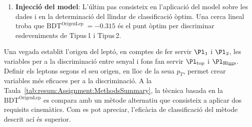 \begin{enumerate}
	
	\item \textbf{Injecció del model}: L'últim pas consisteix en l'aplicació del model sobre les dades i en 
	la determinació del llindar de classificació òptim. Una cerca lineal troba que 
	$\text{BDT}^{\text{OrigenLep }}=-0.315$ és el punt òptim per discriminar esdeveniments de 
	Tipus$\,$1 i Tipus$\,$2. 

\end{enumerate}

Una vegada establit l'origen del leptó, en comptes de fer servir $\Pl_{1}$ i $\Pl_{2}$, les variables 
per a la discriminació entre senyal i fons fan servir $\Pl_{\text{top}}$ i $\Pl_{\text{Higgs}}$. Definir 
els leptons segons el seu origen, en lloc de la seua $p_T$, permet crear variables més eficaces 
per a la discriminació. A la Taula~\ref{tab:resum:Assignment:MethodsSummary}, la tècnica basada 
en la $\text{BDT}^{\text{OrigenLep}}$ es compara amb un mètode alternatiu que consisteix a aplicar 
dos requisits cinemàtics. Com es pot apreciar, l'eficàcia de classificació del mètode descrit ací és superior.


\begin{table}[h]
\centering
{}
\caption{Precisió calculada comparant la predicció del mètode amb el valor real.
El valor real s'ha obtingut utilitzant l'etiquetatge amb l'informació a nivell de partons.
Aquest etiquetatge està disponible per a \Htautau i \HWW però no per \HZZ. 
Només s'han utilitzat esdeveniments on hi havia una correspondència entre els 
leptons a nivell de reconstrucció i a nivell de partons.}
\label{tab:resum:Assignment:MethodsSummary}
\end{table}



